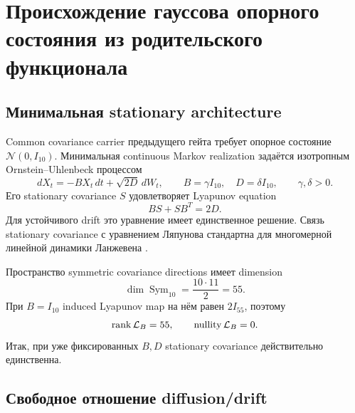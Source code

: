 \chapter{Происхождение гауссова опорного состояния из родительского функционала}
\label{ch:v9-gaussian-reference-state-parent-origin}

\section{Минимальная stationary architecture}

Common covariance carrier предыдущего гейта требует опорное состояние
$\mathcal N(0,I_{10})$. Минимальная continuous Markov realization задаётся
изотропным Ornstein--Uhlenbeck процессом
\begin{equation}
 dX_t=-B X_t\,dt+\sqrt{2D}\,dW_t,
 \qquad B=\gamma I_{10},\quad D=\delta I_{10},
 \qquad \gamma,\delta>0.
 \label{eq:v9-gaussian-reference-ou-process}
\end{equation}
Его stationary covariance $S$ удовлетворяет Lyapunov equation
\begin{equation}
 BS+SB^T=2D.
 \label{eq:v9-gaussian-reference-lyapunov}
\end{equation}
Для устойчивого drift это уравнение имеет единственное решение. Связь
stationary covariance с уравнением Ляпунова стандартна для многомерной
линейной динамики Ланжевена \cite{v9-gaussian-reference-godreche2018}.

Пространство symmetric covariance directions имеет dimension
\begin{equation}
 \dim\operatorname{Sym}_{10}=\frac{10\cdot11}{2}=55.
 \label{eq:v9-gaussian-reference-symmetric-dimension}
\end{equation}
При $B=I_{10}$ induced Lyapunov map на нём равен $2I_{55}$, поэтому
\begin{equation}
 \operatorname{rank}\mathcal L_B=55,
 \qquad \operatorname{nullity}\mathcal L_B=0.
 \label{eq:v9-gaussian-reference-lyapunov-rank}
\end{equation}
Итак, при уже фиксированных $B,D$ stationary covariance действительно
единственна.

\section{Свободное отношение diffusion/drift}

